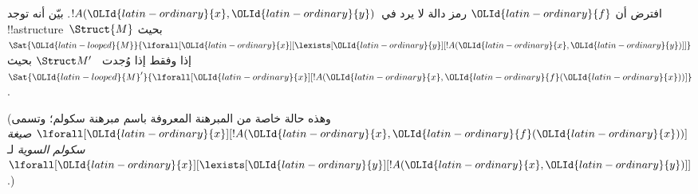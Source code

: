 \documentclass[../../../include/open-logic-section]{subfiles}
\begin{document}
\begin{prob}
افترض أن ${\OLId{latin-ordinary}{f}}$ رمز دالة لا يرد في~$!A({\OLId{latin-ordinary}{x}},{\OLId{latin-ordinary}{y}})$. بيّن أنه توجد
!!a{structure}~$\Struct{M}$ بحيث
$\Sat{{\OLId{latin-looped}{M}}}{\lforall[{\OLId{latin-ordinary}{x}}][\lexists[{\OLId{latin-ordinary}{y}}][!A({\OLId{latin-ordinary}{x}},{\OLId{latin-ordinary}{y}})]]}$ إذا وفقط إذا وُجدت
~$\Struct M'$ بحيث $\Sat{{\OLId{latin-looped}{M}}'}{\lforall[{\OLId{latin-ordinary}{x}}][!A({\OLId{latin-ordinary}{x}},{\OLId{latin-ordinary}{f}}({\OLId{latin-ordinary}{x}}))]}$.

(وهذه حالة خاصة من المبرهنة المعروفة باسم مبرهنة سكولم؛ وتسمى
$\lforall[{\OLId{latin-ordinary}{x}}][!A({\OLId{latin-ordinary}{x}},{\OLId{latin-ordinary}{f}}({\OLId{latin-ordinary}{x}}))]$ \emph{صيغة سكولم السوية}
لـ~$\lforall[{\OLId{latin-ordinary}{x}}][\lexists[{\OLId{latin-ordinary}{y}}][!A({\OLId{latin-ordinary}{x}},{\OLId{latin-ordinary}{y}})]]$.)
\end{prob}
\end{document}
